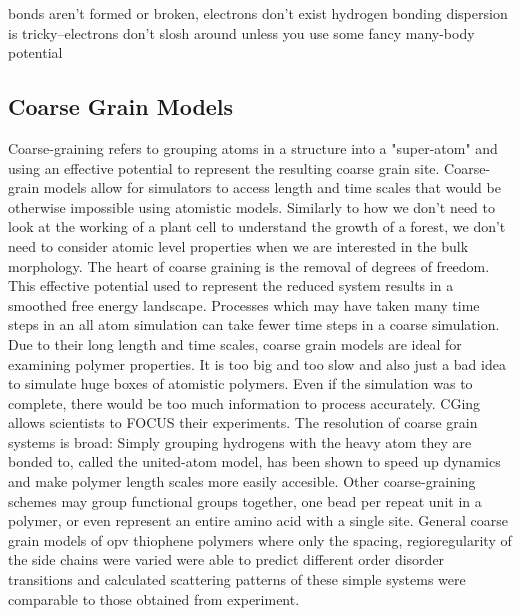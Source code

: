 bonds aren't formed or broken, electrons don't exist
hydrogen bonding
dispersion is tricky--electrons don't slosh around unless you use some fancy many-body potential

\subsection*{Coarse Grain Models}

Coarse-graining refers to grouping atoms in a structure into a "super-atom" and using an effective potential to represent the resulting coarse grain site.
Coarse-grain models allow for simulators to access length and time scales that would be otherwise impossible using atomistic models.
Similarly to how we don't need to look at the working of a plant cell to understand the growth of a forest, we don't need to consider atomic level properties when we are interested in the bulk morphology\cite{Muller-Plathe2002}.
The heart of coarse graining is the removal of degrees of freedom. 
This effective potential used to represent the reduced system results in a smoothed free energy landscape. 
Processes which may have taken many time steps in an all atom simulation can take fewer time steps in a coarse simulation\cite{Berendsen2010}.
Due to their long length and time scales, coarse grain models are ideal for examining polymer properties\cite{Gartner2019a}.
It is too big and too slow and also just a bad idea to simulate huge boxes of atomistic polymers.
Even if the simulation was to complete, there would be too much information to process accurately. 
CGing allows scientists to FOCUS their experiments\cite{Baschnagel2000}.
The resolution of coarse grain systems is broad:
Simply grouping hydrogens with the heavy atom they are bonded to, called the united-atom model, has been shown to speed up dynamics and make polymer length scales more easily accesible\cite{Paul1995a, Yang2006a}.
Other coarse-graining schemes may group functional groups together\cite{Berendsen2010, Jankowski2013, Marsh2014}, one bead per repeat unit in a polymer\cite{Lee2011}, or even represent an entire amino acid with a single site\cite{Peng2019}.
General coarse grain models of opv thiophene polymers where only the spacing, regioregularity of the side chains were varied were able to predict different order disorder transitions and calculated scattering patterns of these simple systems were comparable to those obtained from experiment\cite{Jankowski2013, Marsh2014}.
